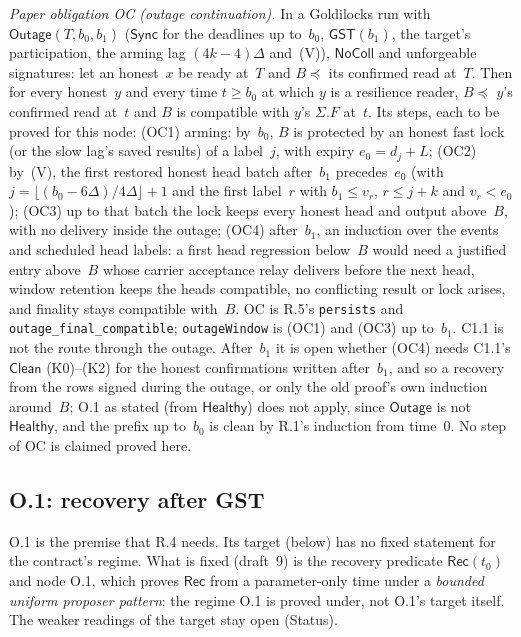 \documentclass{article}
\begin{document}
\emph{Paper obligation OC (outage continuation).}  In a Goldilocks run with
$\mathsf{Outage}(T,b_0,b_1)$ ($\mathsf{Sync}$ for the deadlines up to~$b_0$,
$\mathsf{GST}(b_1)$, the target's participation, the arming lag
$(4k-4)\Delta$ and~(V)), $\mathsf{NoColl}$ and unforgeable signatures: let an
honest~$x$ be ready at~$T$ and $B\preceq$ its confirmed read at~$T$.  Then for
every honest~$y$ and every time $t\geq b_0$ at which $y$ is a resilience reader,
$B\preceq$ $y$'s confirmed read at~$t$ and $B$ is compatible with $y$'s
$\Sigma.F$ at~$t$.  Its steps, each to be proved for this node: (OC1) arming:
by~$b_0$, $B$ is protected by an honest fast lock (or the slow lag's saved
results) of a label~$j$, with expiry $e_0=d_j+L$; (OC2) by~(V), the first
restored honest head batch after~$b_1$ precedes~$e_0$ (with
$j=\lfloor(b_0-6\Delta)/4\Delta\rfloor+1$ and the first label~$r$ with
$b_1\leq v_r$, $r\leq j+k$ and $v_r<e_0$); (OC3) up to that batch the lock keeps
every honest head and output above~$B$, with no delivery inside the outage; (OC4)
after~$b_1$, an induction over the events and scheduled head labels: a first
head regression below~$B$ would need a justified entry above~$B$ whose carrier
acceptance relay delivers before the next head, window retention keeps the heads
compatible, no conflicting result or lock arises, and finality stays compatible
with~$B$.  OC is R.5's \texttt{persists} and \texttt{outage\_final\_compatible};
\texttt{outageWindow} is (OC1) and (OC3) up to~$b_1$.  C1.1 is not the route
through the outage.  After~$b_1$ it is open whether (OC4) needs C1.1's
$\mathsf{Clean}$ (K0)--(K2) for the honest confirmations written after~$b_1$,
and so a recovery from the rows signed during the outage, or only the old
proof's own induction around~$B$; O.1 as stated (from $\mathsf{Healthy}$) does
not apply, since $\mathsf{Outage}$ is not $\mathsf{Healthy}$, and the prefix up
to~$b_0$ is clean by R.1's induction from time~$0$.  No step of OC is claimed
proved here.

\subsection*{O.1: recovery after GST}

O.1 is the premise that R.4 needs.  Its target (below) has no fixed
statement for the contract's regime.  What is fixed (draft~9) is the
recovery predicate $\mathsf{Rec}(t_0)$ and node O.1, which proves
$\mathsf{Rec}$ from a parameter-only time under a \emph{bounded uniform
proposer pattern}: the regime O.1 is proved under, not O.1's target itself.
The weaker readings of the target stay open (Status).
\end{document}
